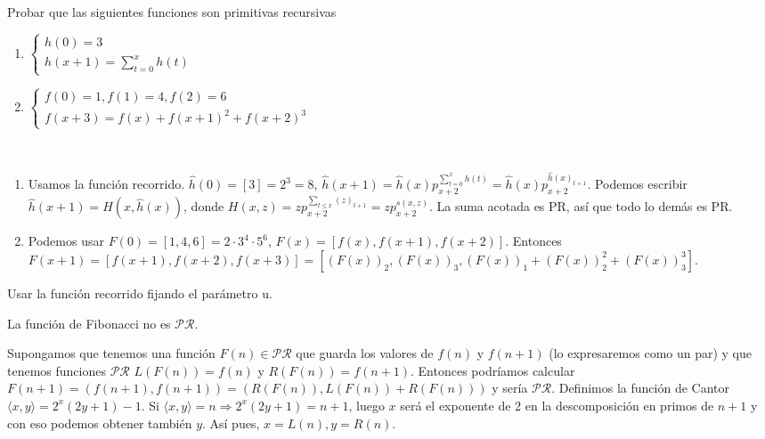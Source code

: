 \documentclass[twoside]{article}
\begin{document}
\begin{ejercicio}{19}
Probar que las siguientes funciones son primitivas recursivas
\begin{enumerate}
\item $\begin{cases}
h(0) = 3\\
h(x + 1) =\sum_{t=0}^x h(t)
\end{cases}$

\item $\begin{cases}
f(0) = 1, f(1) = 4, f(2) = 6\\
f(x + 3) = f(x) + f(x + 1)^2 + f(x + 2)^3
\end{cases}$
\end{enumerate}
\end{ejercicio}
\begin{solucion}\
\begin{enumerate}
\item Usamos la función recorrido. $\hat{h}(0)=[3]=2^3=8$, $\hat{h}(x+1)=\hat{h}(x)p_{x+2}^{\sum_{t=0}^xh(t)}=\hat{h}(x)p_{x+2}^{\hat{h}(x)_{t+1}}$. Podemos escribir $\hat{h}(x+1)=H(x,\hat{h}(x))$, donde $H(x,z)=zp_{x+2}^{\sum_{t\leq x} (z)_{t+1}}=zp_{x+2}^{s(x,z)}$. La suma acotada es PR, así que todo lo demás es PR.
\item Podemos usar $F(0)=[1,4,6]=2\cdot 3^4\cdot 5^6$, $F(x)=[f(x),f(x+1),f(x+2)]$. Entonces $F(x+1)=[f(x+1),f(x+2),f(x+3)]=[(F(x))_2,(F(x))_3,(F(x))_1+(F(x))_2^2+(F(x))_3^3]$. 
\end{enumerate}
\end{solucion}

\newpage

\begin{ejercicio}{22}
\end{ejercicio}
\begin{solucion}
Usar la función recorrido fijando el parámetro u.
\end{solucion}
\newpage

\begin{ejercicio}{}
La función de Fibonacci no es $\mathcal{PR}$.
\end{ejercicio}
\begin{solucion}
Supongamos que tenemos una función $F(n)\in\mathcal{PR}$ que guarda los valores de $f(n)$ y $f(n+1)$ (lo expresaremos como un par) y que tenemos funciones $\mathcal{PR}$ $L(F(n))=f(n)$ y $R(F(n))=f(n+1)$. Entonces podríamos calcular $F(n+1)=(f(n+1),f(n+1))=(R(F(n)), L(F(n))+R(F(n)))$ y sería $\mathcal{PR}$. Definimos la función de Cantor $\langle x,y\rangle =2^x(2y+1)-1$. Si $\langle x,y\rangle =n\Rightarrow 2^x(2y+1)=n+1$, luego $x$ será el exponente de 2 en la descomposición en primos de $n+1$ y con eso podemos obtener también $y$. Así pues, $x=L(n), y=R(n)$. 
\end{solucion}
\end{document}
